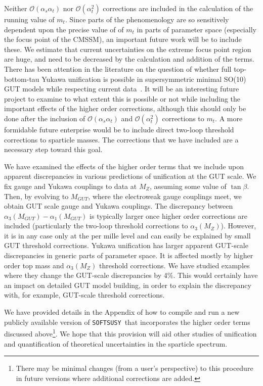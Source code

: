 \documentclass[final,3p,times,pdflatex]{elsarticle}
\begin{document}
 Neither $\mathcal O(\alpha_s \alpha_t) $ nor $\mathcal O(\alpha_t^2)$
 corrections are included in the calculation of the running value of
 $m_t$. Since parts of the phenomenology are so 
 sensitively dependent upon the precise value of of $m_t$ in parts of
 parameter space (especially the focus point of the CMSSM), an important
 future work will be to include these. We estimate that current uncertainties
 on the extreme focus point region are huge, and need to be decreased by the
 calculation and addition of the terms. 
 There has been attention in the literature 
 on the question of whether full top-bottom-tau Yukawa
 unification is possible in supersymmetric minimal SO(10) GUT
 models while respecting current
 data~\cite{Blazek:2002ta,Altmannshofer:2008vr,Anandakrishnan:2014nea}.  
 It will be an interesting future project to examine to what extent this is
 possible or not while including the important effects of the higher order
 corrections, although this should only be done after the inclusion of
 $\mathcal O(\alpha_s \alpha_t) $ and $\mathcal O(\alpha_t^2)$ corrections to
 $m_t$. 
 A more formidable future enterprise would
 be to  include direct two-loop threshold corrections to sparticle masses. The
 corrections that we have included are a necessary step toward this goal. 

 We have examined the effects of the higher order terms that we include
 upon apparent discrepancies in various predictions of unification at the GUT
 scale. We fix gauge and Yukawa couplings to data at $M_Z$, assuming some
 value of $\tan \beta$. Then, by evolving to $M_{GUT}$, where the electroweak
 gauge couplings meet, we obtain GUT scale gauge and Yukawa couplings. The
 discrepancy between $\alpha_3(M_{GUT})-\alpha_1(M_{GUT})$ is typically larger 
 once higher order corrections are included (particularly the two-loop
 threshold corrections to $\alpha_3(M_Z)$). However, it is in any case only at
 the per mille level and can easily be explained by small GUT threshold
 corrections. Yukawa unification has larger apparent GUT-scale discrepancies in
 generic parts of parameter space. It is affected mostly by higher order top
 mass and $\alpha_3(M_Z)$ threshold corrections. We have studied examples
 where they change the GUT-scale
 discrepancies by 4$\%$. This would certainly have an impact on detailed GUT
 model building, in order to explain the discrepancy with, for example,
 GUT-scale  threshold corrections. 
 
 We have provided details in the Appendix of how to compile and run a new
 publicly available version of {\tt    SOFTSUSY}~that incorporates the higher
 order terms discussed above\footnote{There may be minimal changes (from a
   user's 
 perspective) to this procedure in future versions where additional
 corrections are added.}. We hope that this provision will aid other studies of
 unification and quantification of theoretical uncertainties in the sparticle
 spectrum. 
\end{document}
